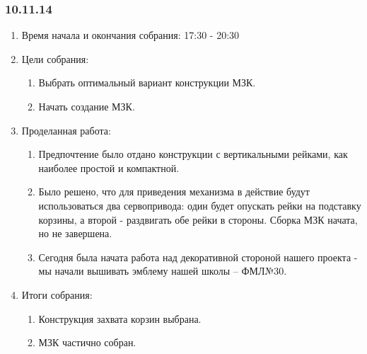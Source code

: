 
\subsubsection{10.11.14}

\begin{enumerate} 
	\item Время начала и окончания собрания:
	17:30 - 20:30
	\item Цели собрания:
	\begin{enumerate}
		\item Выбрать оптимальный вариант конструкции МЗК.
		
		\item Начать создание МЗК.
		
	\end{enumerate}
	
	\item Проделанная работа:
	\begin{enumerate}
		\item Предпочтение было отдано конструкции с вертикальными рейками, как наиболее простой и компактной.
		
		\item Было решено, что для приведения механизма в действие будут использоваться два сервопривода: один будет опускать рейки на подставку корзины, а второй - раздвигать обе рейки в стороны. Сборка МЗК начата, но не завершена.
		
		\item Сегодня была начата работа над декоративной стороной нашего проекта - мы начали вышивать эмблему нашей школы -- ФМЛ№30.
		
		
	\end{enumerate}
	
	\item Итоги собрания: 
	\begin{enumerate}
		\item Конструкция захвата корзин выбрана.
		
		\item МЗК частично собран.
		

\end{enumerate}
\end{enumerate}
